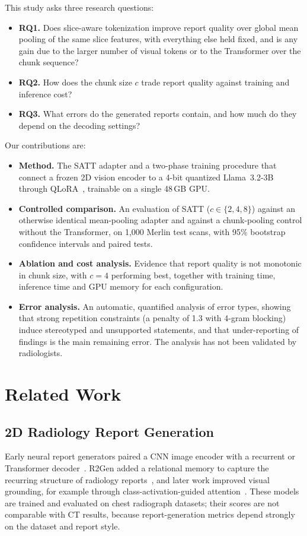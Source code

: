 \documentclass[conference]{IEEEtran}
\begin{document}
This study asks three research questions:
\begin{itemize}
\item \textbf{RQ1.} Does slice-aware tokenization improve report quality over
global mean pooling of the same slice features, with everything else held
fixed, and is any gain due to the larger number of visual tokens or to the
Transformer over the chunk sequence?
\item \textbf{RQ2.} How does the chunk size $c$ trade report quality against
training and inference cost?
\item \textbf{RQ3.} What errors do the generated reports contain, and how
much do they depend on the decoding settings?
\end{itemize}

Our contributions are:
\begin{itemize}
\item \textbf{Method.} The SATT adapter and a two-phase training procedure
that connect a frozen 2D vision encoder to a 4-bit quantized
Llama~3.2-3B~\cite{llama3} through QLoRA~\cite{qlora}, trainable on a single
48\,GB GPU.
\item \textbf{Controlled comparison.} An evaluation of SATT ($c\in\{2,4,8\}$)
against an otherwise identical mean-pooling adapter and against a
chunk-pooling control without the Transformer, on 1,000 Merlin test scans,
with 95\% bootstrap confidence intervals and paired tests.
\item \textbf{Ablation and cost analysis.} Evidence that report quality is
not monotonic in chunk size, with $c=4$ performing best, together with
training time, inference time and GPU memory for each configuration.
\item \textbf{Error analysis.} An automatic, quantified analysis of error
types, showing that strong repetition constraints (a penalty of 1.3 with
4-gram blocking) induce stereotyped and unsupported statements, and that
under-reporting of findings is the main remaining error. The analysis has not
been validated by radiologists.
\end{itemize}

\section{Related Work}

\subsection{2D Radiology Report Generation}
Early neural report generators paired a CNN image encoder with a recurrent
or Transformer decoder~\cite{jing2018}. R2Gen added a relational memory to
capture the recurring structure of radiology reports~\cite{r2gen}, and later
work improved visual grounding, for example through class-activation-guided
attention~\cite{camanet}. These models are trained and evaluated on chest
radiograph datasets; their scores are not comparable with CT results, because
report-generation metrics depend strongly on the dataset and report style.
\end{document}

